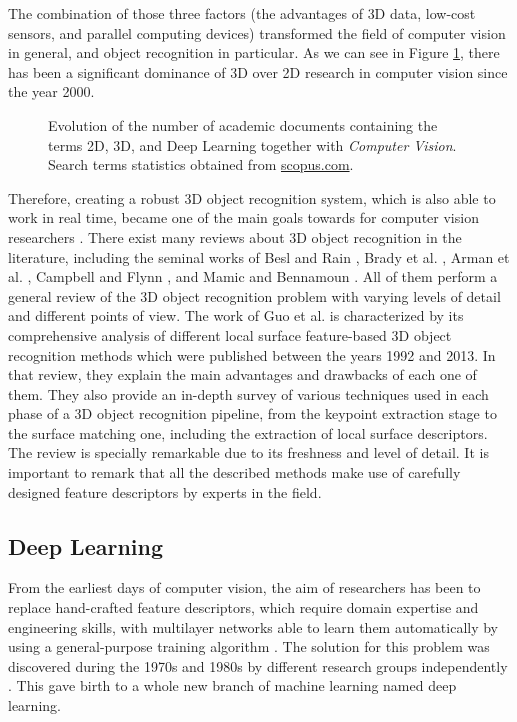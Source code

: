 The combination of those three factors (the advantages of \acs{3D} data, low-cost sensors, and parallel computing devices) transformed the field of computer vision in general, and object recognition in particular. As we can see in Figure \ref{fig:terms_statistics}, there has been a significant dominance of \acs{3D} over \acs{2D} research in computer vision since the year 2000.

\begin{figure}[!b]
	
	\caption{Evolution of the number of academic documents containing the terms 2D, 3D, and Deep Learning together with \emph{Computer Vision}. Search terms statistics obtained from \href{http://www.scopus.com/}{scopus.com}.}
	\label{fig:terms_statistics}
\end{figure}

Therefore, creating a robust \acs{3D} object recognition system, which is also able to work in real time, became one of the main goals towards for computer vision researchers \cite{Ponce2004}. There exist many reviews about \acs{3D} object recognition in the literature, including the seminal works of Besl and Rain \cite{Besl1985}, Brady et al. \cite{Brady1989}, Arman et al. \cite{Arman1993}, Campbell and Flynn \cite{Campbell2001}, and Mamic and Bennamoun \cite{Mamic2002}. All of them perform a general review of the \acs{3D} object recognition problem with varying levels of detail and different points of view. The work of Guo et al. \cite{Guo2014} is characterized by its comprehensive analysis of different local surface feature-based \acs{3D} object recognition methods which were published between the years 1992 and 2013. In that review, they explain the main advantages and drawbacks of each one of them. They also provide an in-depth survey of various techniques used in each phase of a \acs{3D} object recognition pipeline, from the keypoint extraction stage to the surface matching one, including the extraction of local surface descriptors. The review is specially remarkable due to its freshness and level of detail. It is important to remark that all the described methods make use of carefully designed feature descriptors by experts in the field.

\subsection{Deep Learning}
\label{cha:objrecog:sec:relatedworks:subsec:deeplearning}

From the earliest days of computer vision, the aim of researchers has been to replace hand-crafted feature descriptors, which require domain expertise and engineering skills, with multilayer networks able to learn them automatically by using a general-purpose training algorithm \cite{Lecun2015}. The solution for this problem was discovered during the 1970s and 1980s by different research groups independently \cite{Werbos1974}\cite{LeCun1985}\cite{Rumelhart1988}. This gave birth to a whole new branch of machine learning named deep learning.

